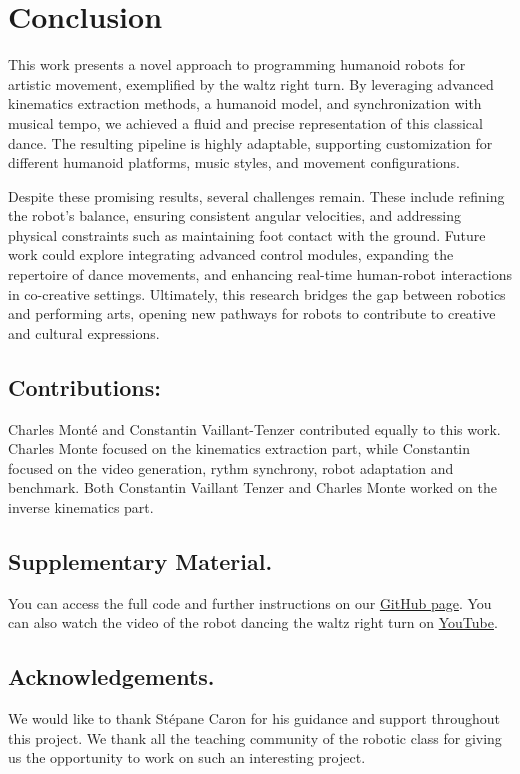 \documentclass{amsart}
\theoremstyle{definition}
\theoremstyle{plain}
\begin{document}
  \section{Conclusion}

  This work presents a novel approach to programming humanoid robots for artistic movement, exemplified by the waltz right turn. 
  By leveraging advanced kinematics extraction methods, a humanoid model, 
  and synchronization with musical tempo, we achieved a fluid and precise representation of this classical dance. 
  The resulting pipeline is highly adaptable, supporting customization for different humanoid platforms, music styles, and movement configurations.

  Despite these promising results, several challenges remain. 
  These include refining the robot's balance, ensuring consistent angular velocities, and addressing physical constraints such as maintaining foot contact with the ground. 
  Future work could explore integrating advanced control modules, expanding the repertoire of dance movements, and enhancing real-time human-robot interactions in co-creative settings. 
  Ultimately, this research bridges the gap between robotics and performing arts, opening new pathways for robots to contribute to creative and cultural expressions.
  

\subsection*{Contributions:} Charles Monté and Constantin Vaillant-Tenzer contributed equally to this work. Charles Monte focused on the kinematics extraction part, while Constantin focused on the video generation, rythm synchrony, robot adaptation and benchmark. 
Both Constantin Vaillant Tenzer and Charles Monte worked on the inverse kinematics part.

\subsection*{Supplementary Material.} You can access the full code and further instructions on our \href{https://github.com/cvt8/waltz_robot}{GitHub page}.
You can also watch the video of the robot dancing the waltz right turn on \href{https://www.youtube.com/watch?v=1MIFP3BURI0}{YouTube}.

\subsection*{Acknowledgements.} We would like to thank Stépane Caron for his guidance and support throughout this project. 
We thank all the teaching community of the robotic class for giving us the opportunity to work on such an interesting project.

\printbibliography[]
\end{document}
